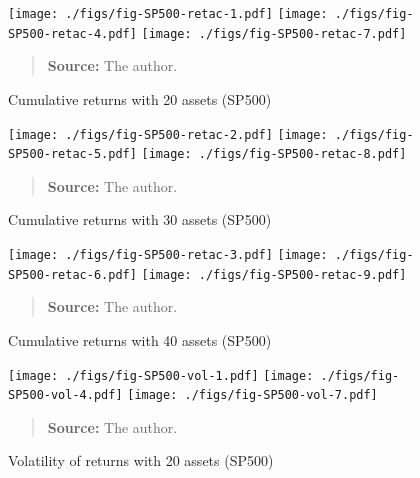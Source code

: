 \documentclass[12pt,oneside,a4paper]{memoir}
\begin{document}
\clearpage

\begin{figure}[htpb]
\centering
\footnotesize
\caption{Cumulative returns with 20 assets (SP500)}
\label{fig:sp500:ret:20a}
\texttt{[image: ./figs/fig-SP500-retac-1.pdf]}
\texttt{[image: ./figs/fig-SP500-retac-4.pdf]}
\texttt{[image: ./figs/fig-SP500-retac-7.pdf]}
\begin{quote}
\textbf{Source:} The author.
\end{quote}
\end{figure}

\begin{figure}[htpb]
\centering
\footnotesize
\caption{Cumulative returns with 30 assets (SP500)}
\label{fig:sp500:ret:30a}
\texttt{[image: ./figs/fig-SP500-retac-2.pdf]}
\texttt{[image: ./figs/fig-SP500-retac-5.pdf]}
\texttt{[image: ./figs/fig-SP500-retac-8.pdf]}
\begin{quote}
\textbf{Source:} The author.
\end{quote}
\end{figure}

\begin{figure}[htpb]
\centering
\footnotesize
\caption{Cumulative returns with 40 assets (SP500)}
\label{fig:sp500:ret:40a}
\texttt{[image: ./figs/fig-SP500-retac-3.pdf]}
\texttt{[image: ./figs/fig-SP500-retac-6.pdf]}
\texttt{[image: ./figs/fig-SP500-retac-9.pdf]}
\begin{quote}
\textbf{Source:} The author.
\end{quote}
\end{figure}


\begin{figure}[htpb]
\centering
\footnotesize
\caption{Volatility of returns with 20 assets (SP500)}
\label{fig:sp500:vol:20a}
\texttt{[image: ./figs/fig-SP500-vol-1.pdf]}
\texttt{[image: ./figs/fig-SP500-vol-4.pdf]}
\texttt{[image: ./figs/fig-SP500-vol-7.pdf]}
\begin{quote}
\textbf{Source:} The author.
\end{quote}
\end{figure}
\end{document}
